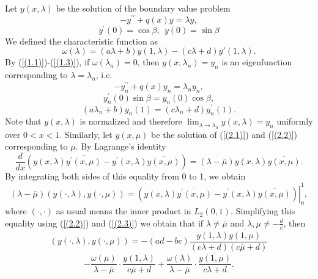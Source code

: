\documentclass[pdflatex,sn-mathphys-num]{sn-jnl}%
\theoremstyle{thmstyleone}%
\theoremstyle{thmstyletwo}%
\theoremstyle{thmstylethree}%
\theoremstyle{definition}
\theoremstyle{remark}
\numberwithin{equation}{section}
\begin{document}
Let $y(x,\lambda)$ be the solution of the boundary value problem  
\begin{equation}
-y^{\prime \prime }+q(x)y=\lambda y,  \label{(2.1)}
\end{equation}
\begin{equation}
y^{\prime }(0)=\cos \beta ,\ \   y(0)=\sin \beta \label{(2.2)}
\end{equation}
We defined the characteristic function as 
\begin{equation}
\omega(\lambda) = (a\lambda + b)y(1,\lambda) - (c\lambda + d)y{'}(1,\lambda).\label{(2.3)}
\end{equation}
By (\ref{(1.1)})-(\ref{(1.3)}), if \(\omega(\lambda_n)=0\), then $y(x,\lambda_n)=y_{n}$ is an eigenfunction corresponding to $\lambda=\lambda_n$, i.e.
\begin{equation}
-y_{n}^{\prime \prime }+q(x)y_{n}=\lambda _{n}y_{n},  \label{(2.4)}
\end{equation}
\begin{equation}
y_{n}^{\prime }(0)\sin \beta =y_{n}(0)\cos \beta ,  \label{(2.5)}
\end{equation}
\begin{equation}
(a\lambda _{n}+b)y_{n}(1)=(c\lambda _{n}+d)y^{\prime }_{n}(1).  \label{(2.6)}
\end{equation}
Note that  $y(x,\lambda)$ is normalized and therefore    $\lim_{\lambda \to \lambda_n}y(x,\lambda)=y_n$ uniformly over $0<x<1$. Similarly, let $y(x,\mu)$ be the solution of (\ref{(2.1)}) and (\ref{(2.2)}) corresponding to $\mu$. 
By Lagrange's identity
$$
\frac{d}{dx}(y(x,\lambda)\overline{y^{\prime }(x,\mu)}-y^{\prime
}(x,\lambda)\overline{y(x,\mu)})= (\lambda - \overline
{\mu})y(x,\lambda)\overline{y(x,\mu)}.
$$
By integrating both sides of this equality from 0 to 1, we obtain
\begin{equation}
(\lambda - \overline
{\mu})\left(y(\cdot,\lambda),y(\cdot,\mu)\right)={\left. {(y(x,\lambda)\overline{y^{\prime }(x,\mu)}-y^{\prime
}(x,\lambda)\overline{y(x,\mu)}) } \right|}_{0}^{1},
\label{(2.7)} \end{equation}
where $(\cdot ,\cdot )$ as usual means the inner product in $L_{2}(0,1)$.
Simplifying this equality  using (\ref{(2.2)}) and (\ref{(2.3)}) we obtain that if $\lambda \ne\overline
{\mu}$ and $\lambda,
{\mu}\ne-\frac{d}{c}$, then
$$
\left(y(\cdot,\lambda), y(\cdot,\mu)\right)
= -(ad - bc)\frac{y(1,\lambda)\overline{y(1,\mu)}}{(c\lambda + d)(c\overline{\mu} + d)}
$$
\begin{equation}
- \frac{\omega(\overline{\mu})}{\lambda - \overline{\mu}} \cdot \frac{y(1,\lambda)}{c\overline{\mu} + d}
+ \frac{\omega(\lambda)}{\lambda - \overline{\mu}} \cdot \frac{\overline{y(1,\mu)}}{c\lambda + d}.\label{(2.8)}
\end{equation}
\end{document}

